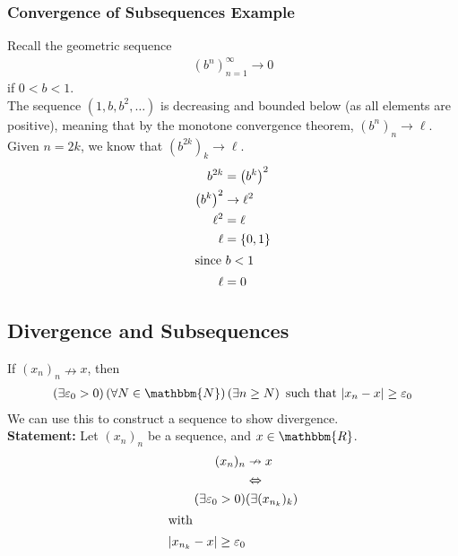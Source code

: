 \documentclass[10pt]{extarticle}
\newcommand{\N}{\mathbbm{N}}
\newcommand{\R}{\mathbbm{R}}
\begin{document}
    \subsubsection{Convergence of Subsequences Example}%
      Recall the geometric sequence
      \begin{align*}
        (b^n)_{n=1}^{\infty} \rightarrow 0
      \end{align*}
      if $0 < b < 1$.\\

      The sequence $(1,b,b^2,\dots)$ is decreasing and bounded below (as all elements are positive), meaning that by the monotone convergence theorem, $(b^n)_{n} \rightarrow \ell$.\\

      Given $n = 2k$, we know that $(b^{2k})_k \rightarrow \ell$.
      \begin{align*}
        b^{2k} &= \left(b^k\right)^2\\
        \left(b^k\right)^2 &\rightarrow \ell^2\\
        \ell^2 &= \ell\\
        \ell &= \{0,1\}\\
        \shortintertext{since $b < 1$}
        \ell &= 0
      \end{align*}
  \subsection{Divergence and Subsequences}%
    If $(x_n)_n \nrightarrow x$, then
    \begin{align*}
      \left(\exists \varepsilon_0> 0\right)\left(\forall N\in\N\right)\left(\exists n\geq N\right) \text{ such that } |x_n-x| \geq \varepsilon_0
    \end{align*}
    We can use this to construct a sequence to show divergence.\\

    \textbf{Statement:} Let $(x_n)_n$ be a sequence, and $x\in\R$.
    \begin{align*}
      (x_n)_n &\nrightarrow x \\
              &\Leftrightarrow\\
      (\exists \varepsilon_0>0)&(\exists (x_{n_k})_k)\\
      \shortintertext{with}
      |x_{n_k} - x| \geq \varepsilon_0
    \end{align*}
\end{document}
